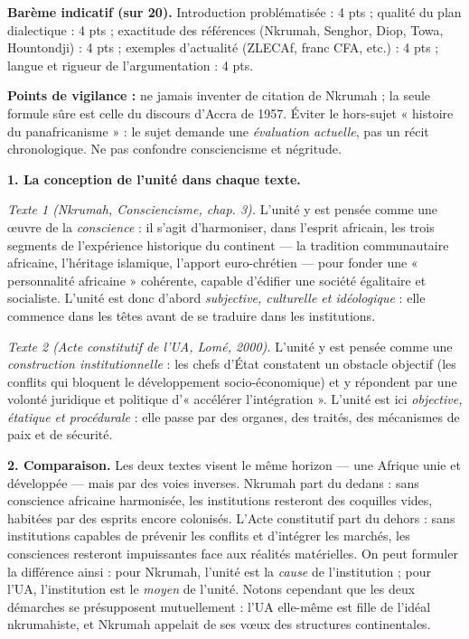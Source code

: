 \documentclass[11pt]{article}
\begin{document}
\begin{corrige}
\textbf{Barème indicatif (sur 20).} Introduction problématisée : 4 pts ; qualité du plan dialectique : 4 pts ; exactitude des références (Nkrumah, Senghor, Diop, Towa, Hountondji) : 4 pts ; exemples d'actualité (ZLECAf, franc CFA, etc.) : 4 pts ; langue et rigueur de l'argumentation : 4 pts.

\textbf{Points de vigilance :} ne jamais inventer de citation de Nkrumah ; la seule formule sûre est celle du discours d'Accra de 1957. Éviter le hors-sujet « histoire du panafricanisme » : le sujet demande une \emph{évaluation actuelle}, pas un récit chronologique. Ne pas confondre consciencisme et négritude.
\end{corrige}

\begin{corrige}

\textbf{1. La conception de l'unité dans chaque texte.}

\emph{Texte 1 (Nkrumah, \emph{Consciencisme}, chap. 3).} L'unité y est pensée comme une œuvre de la \emph{conscience} : il s'agit d'harmoniser, dans l'esprit africain, les trois segments de l'expérience historique du continent — la tradition communautaire africaine, l'héritage islamique, l'apport euro-chrétien — pour fonder une « personnalité africaine » cohérente, capable d'édifier une société égalitaire et socialiste. L'unité est donc d'abord \emph{subjective, culturelle et idéologique} : elle commence dans les têtes avant de se traduire dans les institutions.

\emph{Texte 2 (Acte constitutif de l'UA, Lomé, 2000).} L'unité y est pensée comme une \emph{construction institutionnelle} : les chefs d'État constatent un obstacle objectif (les conflits qui bloquent le développement socio-économique) et y répondent par une volonté juridique et politique d'« accélérer l'intégration ». L'unité est ici \emph{objective, étatique et procédurale} : elle passe par des organes, des traités, des mécanismes de paix et de sécurité.

\textbf{2. Comparaison.} Les deux textes visent le même horizon — une Afrique unie et développée — mais par des voies inverses. Nkrumah part du dedans : sans conscience africaine harmonisée, les institutions resteront des coquilles vides, habitées par des esprits encore colonisés. L'Acte constitutif part du dehors : sans institutions capables de prévenir les conflits et d'intégrer les marchés, les consciences resteront impuissantes face aux réalités matérielles. On peut formuler la différence ainsi : pour Nkrumah, l'unité est la \emph{cause} de l'institution ; pour l'UA, l'institution est le \emph{moyen} de l'unité. Notons cependant que les deux démarches se présupposent mutuellement : l'UA elle-même est fille de l'idéal nkrumahiste, et Nkrumah appelait de ses vœux des structures continentales.


\end{corrige}
\end{document}
